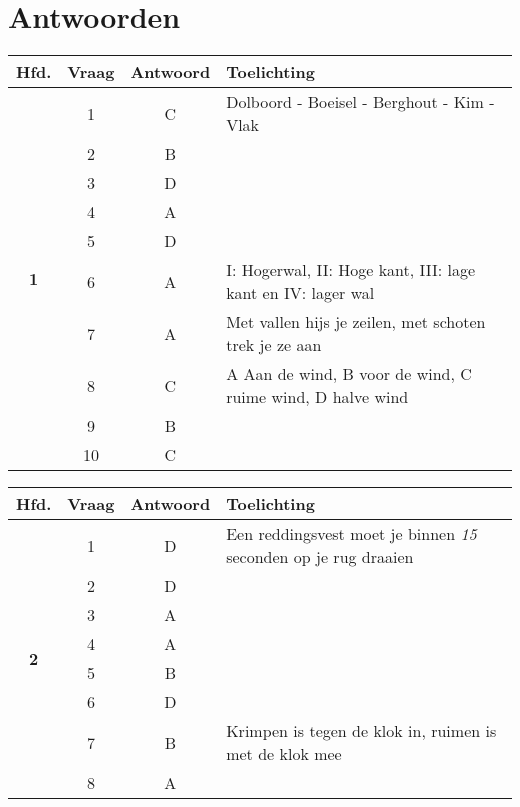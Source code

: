 \chapter{Antwoorden}
\vspace{-120px}
\begin{table}[h]
	\centering
	\begin{tabular}{c|c|c|m{9.5cm}}
	\textbf{Hfd.}       & \textbf{Vraag} & \textbf{Antwoord} & \textbf{Toelichting}                                             \\ \hline
	\multirow{10}{*}{\sffamily\bfseries{\textcolor{ocre}{\LARGE1}} } & 1  & C & Dolboord - Boeisel - Berghout - Kim - Vlak \\ \cline{2-4}          
	& 2 & B &  \\ \cline{2-4} 
	& 3 & D &  \\ \cline{2-4} 
	& 4 & A &  \\ \cline{2-4} 
	& 5 & D &  \\ \cline{2-4} 
	& 6 & A & I: Hogerwal, II: Hoge kant, III: lage kant en IV: lager wal \\ \cline{2-4} 
	& 7 & A & Met vallen hijs je zeilen, met schoten trek je ze aan \\ \cline{2-4} 
	& 8 & C & A Aan de wind, B voor de wind, C ruime wind, D halve wind \\ \cline{2-4} 
	& 9 & B &  \\ \cline{2-4} 
	& 10 & C &  \\ 
	\end{tabular}
\end{table}


\begin{table}[h]
	\centering
	\begin{tabular}{c|c|c|m{9.5cm}}
		\textbf{Hfd.}       & \textbf{Vraag} & \textbf{Antwoord} & \textbf{Toelichting} \\ \hline 
		\multirow{8}{*}{\sffamily\bfseries{\textcolor{ocre}{\LARGE2}} } & 1   & D         & Een reddingsvest moet je binnen \textit{15} seconden op je rug draaien  \\ \cline{2-4} 
		& 2 & D &  \\ \cline{2-4} 
		& 3 & A &  \\ \cline{2-4} 
		& 4 & A &  \\ \cline{2-4} 
		& 5 & B &  \\ \cline{2-4} 
		& 6 & D &  \\ \cline{2-4} 
		& 7 & B & Krimpen is tegen de klok in, ruimen is met de klok mee  \\ \cline{2-4} 
		& 8 & A &  \\ 
	\end{tabular}
\end{table}

